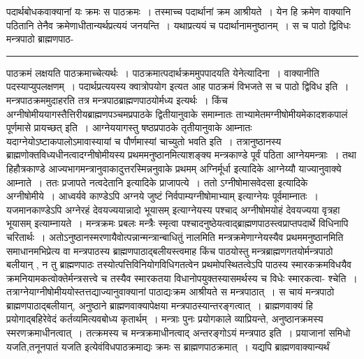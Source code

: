 \documentclass[11pt, openany]{book}
\begin{document}
{\bl पदार्थबोधकवाक्यानां यः क्रमः स पाठक्रमः~। तस्माच्च पदार्थानां क्रम आश्रीयते~। येन हि क्रमेण वाक्यानि पठितानि तेनैव क्रमेणाधीतान्यर्थप्रत्ययं जनयन्ति~। यथाप्रत्ययं च पदार्थानामनुष्ठानम्~। स च पाठो द्विविधः {\al मन्त्रपाठो ब्राह्मणपाठ}-\\}
\hrule
\vspace{3mm}
\noindent
पाठक्रमं लक्षयति पाठक्रमाच्चेत्यर्थः~। पाठक्रमात्पदार्थक्रममुपपादयति {\br येनेत्यादिना~।} वाक्यानीति पदस्याप्युपलक्षणम्~। पदार्थप्रत्ययस्य क्वात्रोपयोग इत्यत आह पाठक्रमं विभजते {\br स च पाठो द्विविध इति~।}
मन्त्रपाठक्रममुदाहरति तत्र मन्त्रपाठब्राह्मणपाठयोर्मध्य इत्यर्थः~। किंच अग्नीषोमीययागस्तैत्तिरीयब्राह्मणपञ्चमप्रपाठके द्वितीयानुवाके
समाम्नातः {\qt ताभ्यामेतमग्नीषोमीयमेकादशकपालं पूर्णमासे प्रायच्छत्} इति~। आग्नेययागस्तु षष्ठप्रपाठके तृतीयानुवाके आम्नातः {\qt यदाग्नेयोऽष्टाकपालोऽमावास्यायां च पौर्णमास्यां चाच्युतो भवति} इति~। तत्रानुष्ठानस्य ब्राह्मणोक्तविध्यधीनत्वादग्नीषोमीयस्य प्रथममनुष्ठानमित्याशङ्क्य मन्त्रकाण्डे पूर्वं पठिता आग्नेयमन्त्राः~। तथा
हि\textendash हौत्रकाण्डे आज्यभागमन्त्रानुवाकादुत्तरस्मिन्ननुवाके प्रथमम् {\qt अग्निर्मूर्धा} इत्यादिके आग्नेय्यौ याज्यानुवाक्ये आम्नाते~। ततः {\qt प्रजापते नत्वदेतानि} इत्यादिके प्राजापत्ये~। ततो {\qt ऽग्नीषोमासवेदसा} इत्यादिके अग्नीषोमीये~। आध्वर्यवे काण्डेऽपि {\qt अग्नये जुष्टं निर्वपाम्यग्नीषोमाभ्याम्} इत्याग्नेयः पूर्वमाम्नातः~। यजमानकाण्डेऽपि {\qt अग्नेरहं देवयज्ययान्नादो भूयासम्} इत्याग्नेयस्य पश्चाद् {\qt अग्नीषोमयोहं देवयज्यया वृत्रहा भूयासम्} इत्याम्नायते~। मन्त्रक्रमः प्रबलः मन्त्रैः
स्मृत्वा पश्चादनुष्ठेयत्वाद्ब्राह्मणपाठस्त्वप्राप्तपदार्थे विधिनापि चरितार्थः~। अतोऽनुष्ठानस्मरणायैवोत्पन्नान्मन्त्रान्बाधितुं नालमिति मन्त्रक्रमेणाग्नेयस्यैव प्रथममनुष्ठानमिति समाधानमभिप्रेत्य वा मन्त्रपाठस्य ब्राह्मणपाठाद्बलीयस्त्वमाह किंच पाठयोस्तु मन्त्रब्राह्मणगतयोर्मन्त्रपाठो बलीयान् , न तु ब्राह्मणपाठः तस्योत्पत्तिविनियोगविधिगतत्वेन प्रथमोपस्थितत्वेऽपि पाठस्य स्मारकक्रमविधयैव क्रमनियामकत्वोक्तेर्मन्त्रसत्त्वे च तस्यैव स्मारकतया विधानोपयुक्तस्यासमर्थस्य च विधेः स्मारकत्वा-
\newpage
{\bl\noindent श्चेति~। तत्राग्नेयाग्नीषोमीययोस्तत्तद्याज्यानुवाक्यानां पाठाद्यःक्रम आश्रीयते स मन्त्रपाठात्~। स चायं मन्त्रपाठो ब्राह्मणपाठाद्बलीयान्, अनुष्ठाने
ब्राह्मणवाक्यापेक्षया मन्त्रपाठस्यान्तरङ्गत्वात्~। ब्राह्मणवाक्यं हि प्रयोगाद्बहिरेवेदं कर्तव्यमित्यवबोध्य कृतार्थम्~। मन्त्राः पुनः प्रयोगकाले व्याप्रियन्ते, अनुष्ठानक्रमस्य स्मरणक्रमाधीनत्वात्~। तत्क्रमस्य च मन्त्रक्रमाधीनत्वाद् अन्तरङ्गोऽयं मन्त्रपाठ इति~। प्रयाजानां {\qtl समिधो यजति,तनूनपातं यजति} इत्येवंविधपाठक्रमाद्यः क्रमः स
ब्राह्मणपाठक्रमात्~। यद्यपि ब्राह्मणवाक्यान्यर्थं\\}
\end{document}
